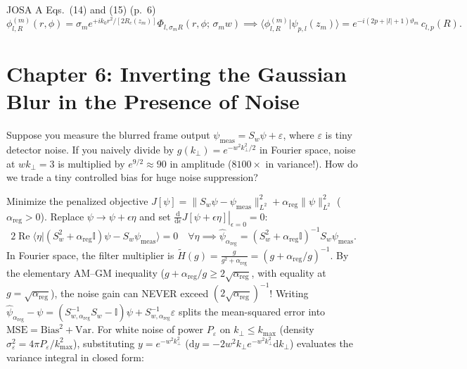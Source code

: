 \documentclass[10pt,letterpaper]{article}
\newcommand{\braket}[2]{\langle #1 | #2 \rangle}
\newcommand{\norm}[1]{\lVert #1 \rVert}
\newcommand{\abs}[1]{\lvert #1 \rvert}
\newcommand{\dd}{\mathrm{d}}
\numberwithin{equation}{section}
\begin{document}
\begin{paperhit}{JOSA A Eqs.~(14) and (15) (p.~6)}
\[
  \phi_{l,R}^{(m)}(r,\phi) = \sigma_m e^{+ik_0 r^2/[2R_c(z_m)]}\Phi_{l,\sigma_m R}(r,\phi;\,\sigma_m w)
  \implies \braket{\phi_{l,R}^{(m)}}{\psi_{p,l}(z_m)} = e^{-i(2p+\abs{l}+1)\vartheta_m}\,c_{l,p}(R).
\]
\end{paperhit}

\section{Chapter 6: Inverting the Gaussian Blur in the Presence of Noise}
\label{sec:c6}

\begin{whystep}
Suppose you measure the blurred frame output $\psi_{\mathrm{meas}} = S_w\psi + \varepsilon$, where $\varepsilon$ is tiny detector noise. If you naively divide by $g(k_\perp) = e^{-w^2 k_\perp^2/2}$ in Fourier space, noise at $wk_\perp = 3$ is multiplied by $e^{9/2} \approx 90$ in amplitude ($8100\times$ in variance!). How do we trade a tiny controlled bias for huge noise suppression?
\end{whystep}

Minimize the penalized objective $J[\psi] = \norm{S_w\psi - \psi_{\mathrm{meas}}}_{L^2}^2 + \alpha_{\mathrm{reg}}\norm{\psi}_{L^2}^2$ ($\alpha_{\mathrm{reg}} > 0$). Replace $\psi \to \psi + \epsilon\eta$ and set $\left.\frac{\dd}{\dd\epsilon}J[\psi+\epsilon\eta]\right|_{\epsilon=0} = 0$:
\begin{equation}
  2\operatorname{Re}\braket{\eta}{(S_w^2 + \alpha_{\mathrm{reg}}\mathbb{I})\psi - S_w\psi_{\mathrm{meas}}} = 0\quad\forall\eta
  \implies \hat{\psi}_{\alpha_{\mathrm{reg}}} = (S_w^2 + \alpha_{\mathrm{reg}}\mathbb{I})^{-1}S_w\psi_{\mathrm{meas}}.
\end{equation}
In Fourier space, the filter multiplier is $\widetilde{H}(g) = \frac{g}{g^2+\alpha_{\mathrm{reg}}} = (g + \alpha_{\mathrm{reg}}/g)^{-1}$. By the elementary AM--GM inequality ($g + \alpha_{\mathrm{reg}}/g \ge 2\sqrt{\alpha_{\mathrm{reg}}}$, with equality at $g = \sqrt{\alpha_{\mathrm{reg}}}$), the noise gain can NEVER exceed $(2\sqrt{\alpha_{\mathrm{reg}}})^{-1}$!
Writing $\hat{\psi}_{\alpha_{\mathrm{reg}}} - \psi = (S_{w,\alpha_{\mathrm{reg}}}^{-1}S_w - \mathbb{I})\psi + S_{w,\alpha_{\mathrm{reg}}}^{-1}\varepsilon$ splits the mean-squared error into $\mathrm{MSE} = \mathrm{Bias}^2 + \mathrm{Var}$. For white noise of power $P_\varepsilon$ on $k_\perp \le k_{\max}$ (density $\sigma_\varepsilon^2 = 4\pi P_\varepsilon/k_{\max}^2$), substituting $y = e^{-w^2 k_\perp^2}$ ($\dd y = -2w^2 k_\perp e^{-w^2 k_\perp^2}\dd k_\perp$) evaluates the variance integral in closed form:
\end{document}
